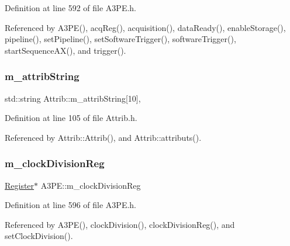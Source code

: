Definition at line 592 of file A3\+P\+E.\+h.



Referenced by A3\+P\+E(), acq\+Reg(), acquisition(), data\+Ready(), enable\+Storage(), pipeline(), set\+Pipeline(), set\+Software\+Trigger(), software\+Trigger(), start\+Sequence\+A\+X(), and trigger().

\mbox{\label{classAttrib_a3414521d7a82476e874b25a5407b5e63}} 
\subsubsection{\texorpdfstring{m\+\_\+attrib\+String}{m\_attribString}}
{\footnotesize\ttfamily std\+::string Attrib\+::m\+\_\+attrib\+String\mbox{[}10\mbox{]}\hspace{0.3cm}{\ttfamily [protected]}, {\ttfamily [inherited]}}



Definition at line 105 of file Attrib.\+h.



Referenced by Attrib\+::\+Attrib(), and Attrib\+::attributs().

\mbox{\label{classA3PE_ae1f4c24a99c2e6ae944a080f429cc155}} 
\subsubsection{\texorpdfstring{m\+\_\+clock\+Division\+Reg}{m\_clockDivisionReg}}
{\footnotesize\ttfamily \hyperlink{classRegister}{Register}$\ast$ A3\+P\+E\+::m\+\_\+clock\+Division\+Reg\hspace{0.3cm}{\ttfamily [private]}}



Definition at line 596 of file A3\+P\+E.\+h.



Referenced by A3\+P\+E(), clock\+Division(), clock\+Division\+Reg(), and set\+Clock\+Division().

\mbox{\label{classElement_abe3de7a5dbbc9a6dd2d7e012e5fdb266}} 
